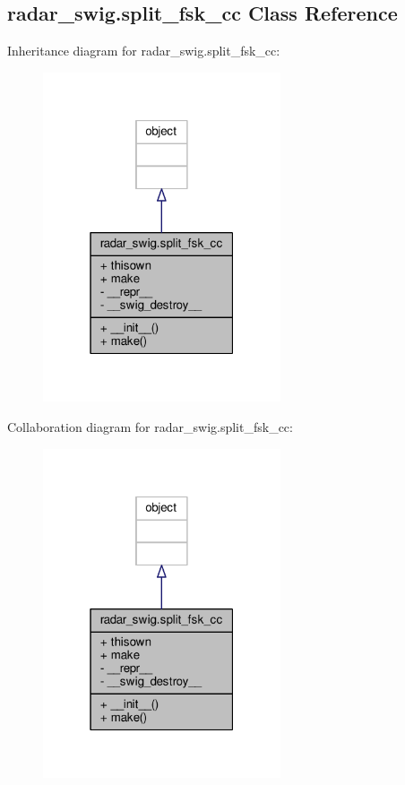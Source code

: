 \subsection{radar\+\_\+swig.\+split\+\_\+fsk\+\_\+cc Class Reference}
\label{classradar__swig_1_1split__fsk__cc}


Inheritance diagram for radar\+\_\+swig.\+split\+\_\+fsk\+\_\+cc\+:
\nopagebreak
\begin{figure}[H]
\begin{center}
\leavevmode
\includegraphics[width=199pt]{db/d2e/classradar__swig_1_1split__fsk__cc__inherit__graph}
\end{center}
\end{figure}


Collaboration diagram for radar\+\_\+swig.\+split\+\_\+fsk\+\_\+cc\+:
\nopagebreak
\begin{figure}[H]
\begin{center}
\leavevmode
\includegraphics[width=199pt]{d0/da4/classradar__swig_1_1split__fsk__cc__coll__graph}
\end{center}
\end{figure}
